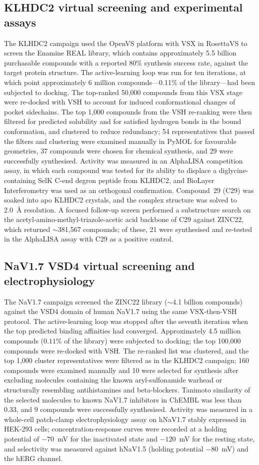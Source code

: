 \documentclass[11pt]{article}
\begin{document}
\subsection{KLHDC2 virtual screening and experimental assays}
The KLHDC2 campaign used the OpenVS platform with VSX in RosettaVS to
screen the Enamine REAL library, which contains approximately 5.5 billion
purchasable compounds with a reported 80\% synthesis success rate, against
the target protein structure. The active-learning loop was run for ten
iterations, at which point approximately 6 million compounds---0.11\% of
the library---had been subjected to docking. The top-ranked 50{,}000
compounds from this VSX stage were re-docked with VSH to account for
induced conformational changes of pocket sidechains. The top 1{,}000
compounds from the VSH re-ranking were then filtered for predicted
solubility and for satisfied hydrogen bonds in the bound conformation,
and clustered to reduce redundancy; 54 representatives that passed the
filters and clustering were examined manually in PyMOL for favourable
geometries, 37 compounds were chosen for chemical synthesis, and 29 were
successfully synthesised. Activity was measured in an AlphaLISA
competition assay, in which each compound was tested for its ability to
displace a diglycine-containing SelK C-end degron peptide from KLHDC2,
and BioLayer Interferometry was used as an orthogonal confirmation.
Compound~29 (C29) was soaked into apo KLHDC2 crystals, and the complex
structure was solved to 2.0~\AA{} resolution. A focused follow-up screen
performed a substructure search on the acetyl-amino-methyl-triazole-acetic
acid backbone of C29 against ZINC22, which returned $\sim$381{,}567
compounds; of these, 21 were synthesised and re-tested in the AlphaLISA
assay with C29 as a positive control.

\subsection{NaV1.7 VSD4 virtual screening and electrophysiology}
The NaV1.7 campaign screened the ZINC22 library
($\sim$4.1 billion compounds) against the VSD4 domain of human NaV1.7
using the same VSX-then-VSH protocol. The active-learning loop was stopped
after the seventh iteration when the top predicted binding affinities had
converged. Approximately 4.5 million compounds ($0.11\%$ of the library)
were subjected to docking; the top 100{,}000 compounds were re-docked
with VSH. The re-ranked list was clustered, and the top 1{,}000
cluster representatives were filtered as in the KLHDC2 campaign; 160
compounds were examined manually and 10 were selected for synthesis after
excluding molecules containing the known aryl-sulfonamide warhead or
structurally resembling antihistamines and beta-blockers. Tanimoto
similarity of the selected molecules to known NaV1.7 inhibitors in ChEMBL
was less than 0.33, and 9 compounds were successfully synthesised.
Activity was measured in a whole-cell patch-clamp electrophysiology assay
on hNaV1.7 stably expressed in HEK-293 cells; concentration-response
curves were recorded at a holding potential of $-70$~mV for the
inactivated state and $-120$~mV for the resting state, and selectivity
was measured against hNaV1.5 (holding potential $-80$~mV) and the hERG
channel.
\end{document}
